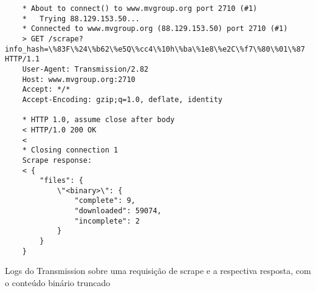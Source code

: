 \begin{listing}[H]
    \begin{verbatim}
    * About to connect() to www.mvgroup.org port 2710 (#1)
    *   Trying 88.129.153.50...
    * Connected to www.mvgroup.org (88.129.153.50) port 2710 (#1)
    > GET /scrape?info_hash=\%83F\%24\%b62\%e5Q\%cc4\%10h\%ba\%1e8\%e2C\%f7\%80\%01\%87 HTTP/1.1
    User-Agent: Transmission/2.82
    Host: www.mvgroup.org:2710
    Accept: */*
    Accept-Encoding: gzip;q=1.0, deflate, identity

    * HTTP 1.0, assume close after body
    < HTTP/1.0 200 OK
    <
    * Closing connection 1
    Scrape response:
    < {
        "files": {
            \"<binary>\": {
                "complete": 9,
                "downloaded": 59074,
                "incomplete": 2
            }
        }
    }
    \end{verbatim}

    \caption{Logs do Transmission sobre uma requisição de scrape e a respectiva
    resposta, com o conteúdo binário truncado}
    \label{lst:scrape}
\end{listing}